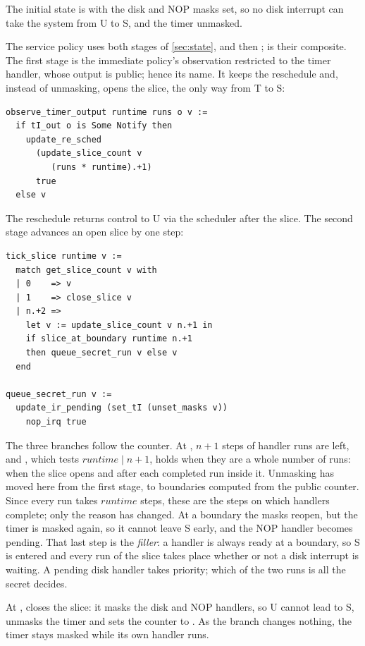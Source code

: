 The initial state  is  with the disk and NOP masks
set, so no disk interrupt can take the system from U to S, and the timer unmasked.

The service policy uses both stages of \cref{sec:state}, 
and then ;  is their composite. The first stage is the
immediate policy's observation restricted to the timer handler, whose output
is public; hence its name. It keeps the
reschedule and, instead of unmasking, opens the slice, the only way from T to S:
\begin{lstlisting}
observe_timer_output runtime runs o v :=
  if tI_out o is Some Notify then
    update_re_sched
      (update_slice_count v
         (runs * runtime).+1)
      true
  else v
\end{lstlisting}

The reschedule returns control to U via the scheduler after the slice. The second
stage advances an open slice by one step:

\noindent\begin{minipage}{\linewidth}
\begin{lstlisting}
tick_slice runtime v :=
  match get_slice_count v with
  | 0    => v
  | 1    => close_slice v
  | n.+2 =>
    let v := update_slice_count v n.+1 in
    if slice_at_boundary runtime n.+1
    then queue_secret_run v else v
  end

queue_secret_run v :=
  update_ir_pending (set_tI (unset_masks v))
    nop_irq true
\end{lstlisting}
\end{minipage}
The three branches follow the counter. At , $n+1$ steps of handler runs are left, and
, which tests $\mathit{runtime} \mid n+1$, holds when they are a
whole number of runs: when the slice opens and after each
completed run inside it. Unmasking has moved here from the first stage, to boundaries
computed from the public counter. Since every run takes $\mathit{runtime}$ steps, these
are the steps on which handlers complete; only the reason has changed. At a boundary
the masks reopen, but the timer is masked again, so it cannot leave S early,
and the NOP handler becomes pending. That last step is the \emph{filler}: a handler
is always ready at a boundary, so S is entered and every run of the slice takes place
whether or not a disk interrupt is waiting. A pending disk handler takes priority;
which of the two runs is all the secret decides.

At , 
closes the slice: it masks the disk and NOP handlers, so U cannot lead to S, unmasks
the timer and sets the counter to . As the  branch changes nothing,
the timer stays masked while its own handler runs.


